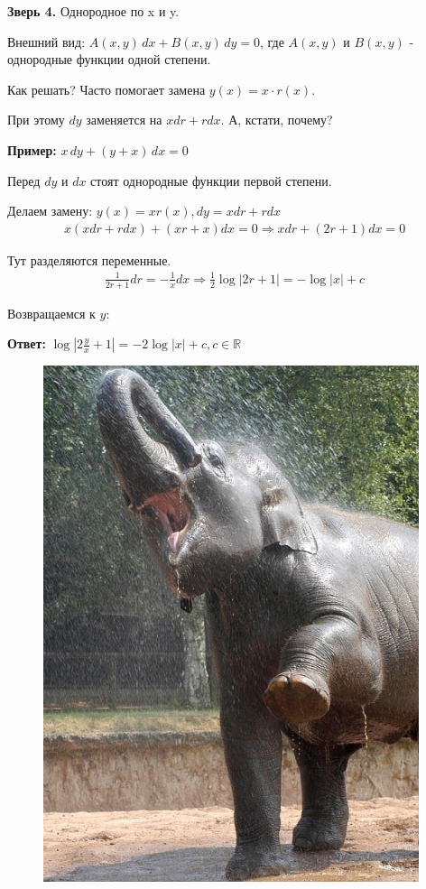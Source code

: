 \documentclass[10pt,a4paper]{article}
\begin{document}
\par \textbf{Зверь 4.} Однородное по x и y.
\par Внешний вид: $A(x, y) \, dx + B(x,y) \, dy = 0$,  где $A(x,y)$ и $B(x,y)$ - однородные функции одной степени.
\par Как решать? Часто помогает замена $y(x) = x \cdot r(x)$.
\par При этому $dy$ заменяется на $xdr + rdx$. А, кстати, почему?
\par \textbf{Пример:} $x \, dy + (y+x) \, dx = 0$
\par Перед $dy$ и $dx$ стоят однородные функции первой степени.
\par Делаем замену: $y(x) = xr(x), dy = xdr + rdx $
\begin{eqnarray*}
x(xdr + rdx) + (xr + x) dx = 0 \Rightarrow xdr + (2r+1)dx = 0 
\end{eqnarray*}
\par Тут разделяются переменные.
\begin{eqnarray*}
\frac{1}{2r + 1} dr = -\frac{1}{x} dx \Rightarrow \frac{1}{2}\log|2r + 1| = -\log|x| + c
\end{eqnarray*}
\par Возвращаемся к $y$:
\par \textbf{Ответ:} $\log|2\frac yx + 1| = -2\log|x| + c, c \in \mathbb{R}$ \\
\newpage
\pagecolor{Salmon}
\begin{figure}[h]
\centering
\includegraphics[width = 11cm]{eleph.jpg}
\end{figure}
\end{document}
